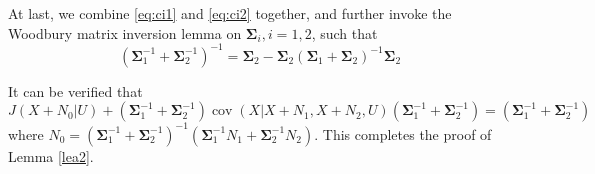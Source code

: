 \documentclass[journal,final, onecolumn]{IEEEtran}
\DeclareMathOperator{\cov}{cov}
\begin{document}
\begin{IEEEproof}
At last, we combine \eqref{eq:ci1} and \eqref{eq:ci2} together, and further invoke the Woodbury matrix inversion lemma on $ \boldsymbol{\Sigma}_{i}, i=1,2$, such that
\begin{equation}
 \left( \boldsymbol{\Sigma}_{1}^{-1} +  \boldsymbol{\Sigma}_{2}^{-1} \right)^{-1} =  \boldsymbol{\Sigma}_{2} - \boldsymbol{\Sigma}_{2}\left( \boldsymbol{\Sigma}_{1} + \boldsymbol{\Sigma}_{2}\right)^{-1}\boldsymbol{\Sigma}_{2}
\end{equation}

It can be verified that
\begin{equation}
J(X+N_{0}|U)+\left( \boldsymbol{\Sigma}_{1}^{-1} +  \boldsymbol{\Sigma}_{2}^{-1} \right) \cov(X|X+N_{1},X+N_{2},U) \left( \boldsymbol{\Sigma}_{1}^{-1} +  \boldsymbol{\Sigma}_{2}^{-1} \right) = \left( \boldsymbol{\Sigma}_{1}^{-1} +  \boldsymbol{\Sigma}_{2}^{-1} \right)
\end{equation}
where $N_{0}= \left( \boldsymbol{\Sigma}_{1}^{-1} + \boldsymbol{\Sigma}_{2}^{-1}\right)^{-1} \left(  \boldsymbol{\Sigma}_{1}^{-1} N_{1} +    \boldsymbol{\Sigma}_{2}^{-1} N_{2} \right)$. This completes the proof of Lemma \ref{lea2}.


\end{IEEEproof}
\smallskip
\end{document}
